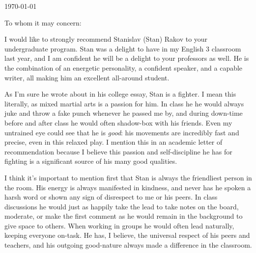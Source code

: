\documentclass[11pt, letterpaper]{letter} %
\begin{document}

\begin{letter}{
	\today\\	
}


\opening{To whom it may concern:}

I would like to strongly recommend Stanislav (Stan) Rakov to your undergraduate program. Stan was a delight to have in my English 3 classroom last year, and I am confident he will be a delight to your professors as well. He is the combination of an energetic personality, a confident speaker, and a capable writer, all making him an excellent all-around student.

As I'm sure he wrote about in his college essay, Stan is a fighter. I mean this literally, as mixed martial arts is a passion for him. In class he he would always juke and throw a fake punch whenever he passed me by, and during down-time before and after class he would often shadow-box with his friends. Even my untrained eye could see that he is \emph{good}: his movements are incredibly fast and precise, even in this relaxed play. I mention this in an academic letter of recommendation because I believe this passion and self-discipline he has for fighting is a significant source of his many good qualities.

I think it's important to mention first that Stan is always the friendliest person in the room. His energy is always manifested in kindness, and never has he spoken a harsh word or shown any sign of disrespect to me or his peers. In class discussions he would just as happily take the lead to take notes on the board, moderate, or make the first comment as he would remain in the background to give space to others. When working in groups he would often lead naturally, keeping everyone on-task. He has, I believe, the universal respect of his peers and teachers, and his outgoing good-nature always made a difference in the classroom.


\end{letter}
\end{document}
